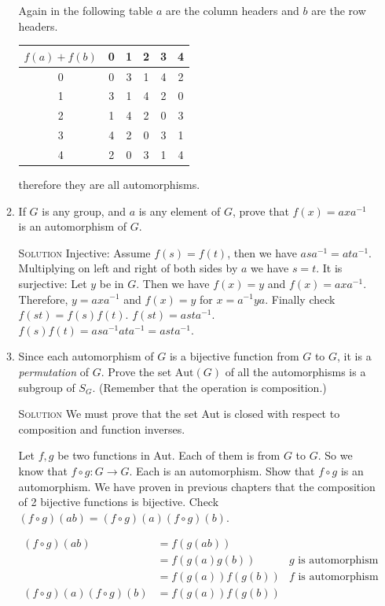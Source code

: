 \documentclass[twoside]{amsart}
\newcommand{\solution}{\textsc{Solution}\xspace}
\newcommand{\blank}{\vspace{5pt}}
\begin{document}
\begin{enumerate}[A.]
\begin{enumerate}[1]
      Again in the following table $a$ are the column headers and $b$
      are the row headers.
      \begin{center}
      \begin{tabular}{c|ccccc}
         $f(a)+f(b)$ & 0 & 1 & 2 & 3 & 4 \\ \hline
                   0 & 0 & 3 & 1 & 4 & 2 \\
                   1 & 3 & 1 & 4 & 2 & 0 \\
                   2 & 1 & 4 & 2 & 0 & 3 \\
                   3 & 4 & 2 & 0 & 3 & 1 \\
                   4 & 2 & 0 & 3 & 1 & 4 
      \end{tabular}
      \end{center}

      therefore they are all automorphisms.

      \blank
      \item If $G$ is any group, and $a$ is any element of $G$, prove
      that $f(x) = axa^{-1}$ is an automorphism of $G$.

      \blank \noindent \solution Injective: Assume $f(s)=f(t)$,
      then we have $asa^{-1} = ata^{-1}$. Multiplying on left and right
      of both sides by $a$ we have $s=t$. It is surjective:
      Let $y$ be in $G$. Then we have $f(x)=y$ and $f(x)=axa^{-1}$. 
      Therefore, $y=axa^{-1}$ and $f(x)=y$ for $x=a^{-1}ya$.
      Finally check $f(st)=f(s)f(t)$. $f(st)=asta^{-1}$. $f(s)f(t) =
      asa^{-1}ata^{-1} = asta^{-1}$.

      \blank
      \item Since each automorphism of $G$ is a bijective function from $G$
      to $G$, it is a \emph{permutation} of $G$. Prove the set 
      $\mathrm{Aut}(G)$ of all the automorphisms is a subgroup of $S_G$.
      (Remember that the operation is composition.)
      
      \blank \noindent \solution We must prove that the set Aut is closed
      with respect to composition and function inverses.

      Let $f, g$ be two functions in Aut. Each of them is from $G$ to $G$.
      So we know that $f \circ g : G \to G$.
      Each is an automorphism. Show that $f \circ g$ is an automorphism.
      We have proven in previous chapters that the composition of 2 bijective
      functions is bijective. Check $(f \circ g)(ab) = (f \circ g)(a)(f 
      \circ g)(b)$.

      \setcounter{equation}{0}
      \begin{align}
         (f \circ g)(ab) &= f(g(ab)) \\
                         &= f(g(a)g(b)) & \text{$g$ is automorphism 1}\\
                         &= f(g(a))f(g(b)) & \text{$f$ is automorphism 2} \\
         (f \circ g)(a)(f \circ g)(b) &= f(g(a))f(g(b)) 
      \end{align}


\end{enumerate}
\end{enumerate}
\end{document}
